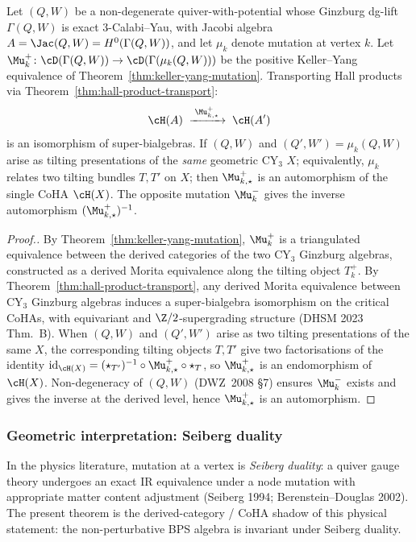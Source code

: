 \begin{theorem}
\label{thm:mutation-coha-automorphism}
Let $(Q, W)$ be a non-degenerate quiver-with-potential
whose Ginzburg dg-lift $\Gamma(Q, W)$ is exact $3$-Calabi--Yau, with Jacobi
algebra $A = \Jac(Q, W) = H^0(\Gamma(Q, W))$, and let $\mu_k$ denote mutation
at vertex $k$. Let $\Mu_k^{+} \colon \cD(\Gamma(Q, W)) \to
\cD(\Gamma(\mu_k(Q, W)))$ be the positive Keller--Yang equivalence of
Theorem~\ref{thm:keller-yang-mutation}. Transporting Hall products via
Theorem~\ref{thm:hall-product-transport}:
\[
 \cH(A) \;\xrightarrow{\;\Mu_{k,\star}^{+}\;}\; \cH(A')
\]
is an isomorphism of super-bialgebras. If $(Q, W)$ and $(Q', W') =
\mu_k(Q, W)$ arise as tilting presentations of the \emph{same} geometric
CY$_3$ $X$; equivalently, $\mu_k$ relates two tilting bundles $T, T'$ on
$X$; then $\Mu_{k,\star}^{+}$ is an automorphism of the single CoHA
$\cH(X)$. The opposite mutation $\Mu_k^{-}$ gives the inverse automorphism
$(\Mu_{k,\star}^{+})^{-1}$.
\end{theorem}

\begin{proof}[Proof.]
By Theorem~\ref{thm:keller-yang-mutation}, $\Mu_k^{+}$ is a triangulated
equivalence between the derived categories of the two CY$_3$ Ginzburg
algebras, constructed as a derived Morita equivalence along the tilting
object $T_k^{+}$. By Theorem~\ref{thm:hall-product-transport}, any derived
Morita equivalence between CY$_3$ Ginzburg algebras induces a super-bialgebra
isomorphism on the critical CoHAs, with equivariant and $\Z/2$-supergrading
structure (DHSM 2023 Thm.~B). When $(Q, W)$ and $(Q', W')$ arise as two
tilting presentations of the same $X$, the corresponding tilting objects
$T, T'$ give two factorisations of the identity
$\mathrm{id}_{\cH(X)} = (\star_{T'})^{-1} \circ \Mu_{k,\star}^{+} \circ \star_T$,
so $\Mu_{k,\star}^{+}$ is an endomorphism of $\cH(X)$. Non-degeneracy of
$(Q, W)$ (DWZ~2008 \S7) ensures $\Mu_k^{-}$ exists and gives the inverse
at the derived level, hence $\Mu_{k,\star}^{+}$ is an automorphism.
\end{proof}

\subsubsection{Geometric interpretation: Seiberg duality}

In the physics literature, mutation at a vertex is \emph{Seiberg duality}: a
quiver gauge theory undergoes an exact IR equivalence under a node mutation
with appropriate matter content adjustment (Seiberg 1994; Berenstein--Douglas
2002). The present theorem is the derived-category / CoHA shadow of this
physical statement: the non-perturbative BPS algebra is invariant under
Seiberg duality.

